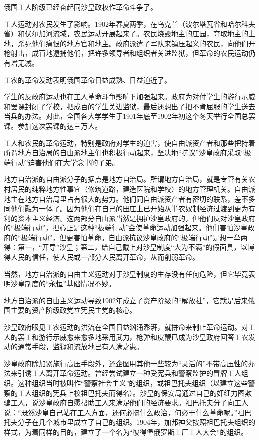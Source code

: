 俄国工人阶级已经奋起同沙皇政权作革命斗争了。

工人运动对农民发生了影响。1902年春夏两季，在乌克兰（波尔塔瓦省和哈尔科夫省）和伏尔加河流域，农民运动开展起来了。农民烧毁地主的庄园，夺取地主的土地，杀死他们痛恨的地方官和地主。政府派遣了军队来镇压起义的农民，向他们开枪射击，成百地逮捕他们，把许多领导者和组织者关进监狱，但革命的农民运动仍有增无减。

工农的革命发动表明俄国革命日益成熟、日益迫近了。

学生的反政府运动也在工人革命斗争影响下加强起来。政府为对付学生的游行示威和罢课封闭了学校，把成百的学生关进监狱，最后还想出了把不肯屈服的学生送去当兵的办法。对此，全国各大学学生于1901年底至1902年初这个冬天举行全国总罢课。参加这次罢课的达三万人。

工人和农民的革命运动，特别是政府对学生的迫害，使自由派资产者和那些把持着所谓地方自治局的自由派地主们也积极行动起来，坚决地“抗议”沙皇政府采取“极端行动”迫害他们在大学念书的子弟。

地方自治派的自由派分子的据点是地方自治局。所谓地方自治局，就是专管有关农村居民的纯粹地方性事宜（修筑道路，建造医院和学校）的地方管理机关。自由派地主在地方自治局里占有很大的势力。他们同自由派资产者有密切的联系，差不多同他们融为一体了。因为他们在自己的田庄上已开始从半农奴制经济过渡到更为有利的资本主义经济。这两部分自由派当然是拥护沙皇政府的，但他们反对沙皇政府的“极端行动”，担心正是这种“板端行动”会使革命运动加强起来。他们害怕沙皇政府的“极端行动”，但更害怕革命。自由派抗议沙皇政府的“极端行动”是想一举两得：第一，“开导”沙皇；第二，给自己戴上对沙皇制度“大为不满”的假面具，以博得人民的信任，使人民或一部分人民离开革命，从而削弱革命。

当然，地方自治派的自由主义运动对于沙皇制度的生存没有任何危险，但它毕竟表明沙皇制度的“永恒”基础情况不妙。

地方自治派的自由主义运动导致1902年成立了资产阶级的“解放社”，它就是后来俄国主要的资产阶级政党立宪民主党的核心。

沙皇政府眼见工农运动的洪流在全国日益汹涌澎湃，就拼命来制止革命运动。对工人的罢工和游行示威愈来愈多地采用武力，枪弹和皮鞭已成为沙皇政府回答工农发动的通常手段，监狱和流放地已有人满之患。

沙皇政府除加紧施行高压手段外，还企图用其他一些较为“灵活的”不带高压性的办法来引诱工人离开革命运动。曾经尝试建立一种受宪兵和警察监护的冒牌工人组织。这种组织当时被叫作“警察社会主义”的组织，或祖巴托夫组织（以建立这些警察的工人组织的宪兵上校祖巴托夫而得名）。沙皇的保安局通过自己的奸细力图欺骗工人，说沙皇政府自愿帮助工人来满足他们的经济要求。祖巴托夫分子向工人说：“既然沙皇自己站在工人方面，还何必搞什么政治，何必干什么革命呢。”祖巴托夫分子在几个城市里成立了自己的组织。1904年，加邦神父按照祖巴托夫组织的样式，为着同样的目的，建立了一个名为“彼得堡俄罗斯工厂工人大会”的组织。

